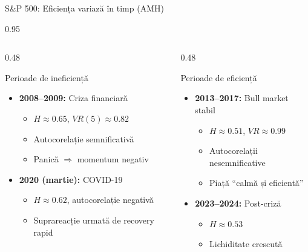 \documentclass[9pt, aspectratio=169, t]{beamer}
\begin{document}
\begin{frame}{S\&P 500: Eficiența variază în timp (AMH)}
    \begin{cminipage}{0.95\textwidth}
\begin{columns}[T]
\begin{column}{0.48\textwidth}
\begin{block}{Perioade de ineficiență}
\begin{itemize}\setlength{\itemsep}{0pt}
    \item \textbf{2008--2009:} Criza financiară
    \begin{itemize}\setlength{\itemsep}{0pt}
        \item $H \approx 0.65$, $VR(5) \approx 0.82$
        \item Autocorelație semnificativă
        \item Panică $\Rightarrow$ momentum negativ
    \end{itemize}
    \item \textbf{2020 (martie):} COVID-19
    \begin{itemize}\setlength{\itemsep}{0pt}
        \item $H \approx 0.62$, autocorelație negativă
        \item Suprareacție urmată de recovery rapid
    \end{itemize}
\end{itemize}
\end{block}
\end{column}
\begin{column}{0.48\textwidth}
\begin{block}{Perioade de eficiență}
\begin{itemize}\setlength{\itemsep}{0pt}
    \item \textbf{2013--2017:} Bull market stabil
    \begin{itemize}\setlength{\itemsep}{0pt}
        \item $H \approx 0.51$, $VR \approx 0.99$
        \item Autocorelații nesemnificative
        \item Piață ``calmă și eficientă''
    \end{itemize}
    \item \textbf{2023--2024:} Post-criză
    \begin{itemize}\setlength{\itemsep}{0pt}
        \item $H \approx 0.53$
        \item Lichiditate crescută
    \end{itemize}
\end{itemize}
\end{block}
\end{column}
\end{columns}


\end{cminipage}
\end{frame}
\end{document}
